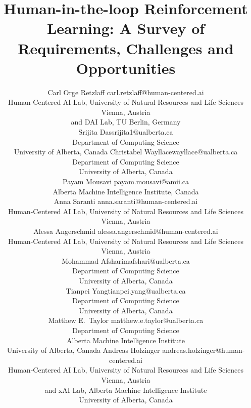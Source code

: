 \documentclass[twoside,11pt]{article}
\begin{document}
\title{Human-in-the-loop Reinforcement Learning: A Survey of Requirements, Challenges and Opportunities}

\author{\name Carl Orge Retzlaff \email carl.retzlaff@human-centered.ai\\ 
\addr Human-Centered AI Lab, University of Natural Resources and Life Sciences Vienna, Austria\\
and DAI Lab, TU Berlin, Germany\\
\AND
\name Srijita Das\email srijita1@ualberta.ca \\
\addr Department of Computing Science \\ 
University of Alberta, Canada
\AND
\name Christabel Wayllace\email wayllace@ualberta.ca \\
\addr Department of Computing Science \\ University of Alberta, Canada\\
\AND
\name Payam Mousavi \email payam.mousavi@amii.ca \\
\addr Alberta Machine Intelligence Institute, Canada\\
\AND
\name Anna Saranti \email anna.saranti@human-centered.ai \\
\addr Human-Centered AI Lab, University of Natural Resources and Life Sciences Vienna, Austria\\
\AND
\name Alessa Angerschmid \email alessa.angerschmid@human-centered.ai \\
\addr Human-Centered AI Lab, University of Natural Resources and Life Sciences Vienna, Austria\\
\AND
\name Mohammad Afshari\email mafshari@ualberta.ca \\
\addr Department of Computing Science \\ University of Alberta, Canada\\
\AND
\name Tianpei Yang\email tianpei.yang@ualberta.ca \\
\addr Department of Computing Science \\ University of Alberta, Canada\\
\AND
\name Matthew E.~Taylor \email matthew.e.taylor@ualberta.ca \\
\addr Department of Computing Science\\
Alberta Machine Intelligence Institute\\
University of Alberta, Canada
\AND
\name Andreas Holzinger \email andreas.holzinger@human-centered.ai \\
\addr Human-Centered AI Lab, University of Natural Resources and Life Sciences Vienna, Austria \\
and xAI Lab, Alberta Machine Intelligence Institute\\
University of Alberta, Canada
}
\end{document}
